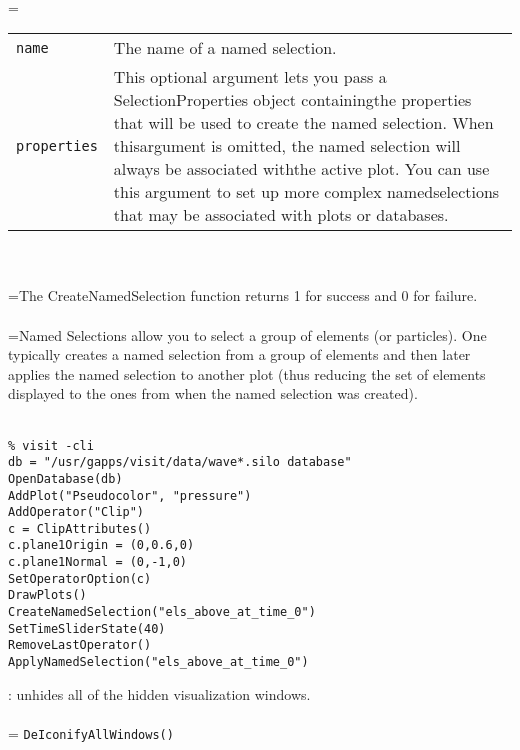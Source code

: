 \documentclass[10pt,a4paper]{report}
\begin{document}
 \\ 
\hangindent=\parindent 
\begin{tabular}{lp{9cm}}
\verb!name! & The name of a named selection. \\
\verb!properties! & This optional argument lets you pass a SelectionProperties object containingthe properties that will be used to create the named selection. When thisargument is omitted, the named selection will always be associated withthe active plot. You can use this argument to set up more complex namedselections that may be associated with plots or databases. \\
\end{tabular} \\[-2mm]


 \\ 
\hangindent=\parindent The CreateNamedSelection function returns 1 for success and 0 for failure. \\[-3mm] 

 \\ 
\hangindent=\parindent Named Selections allow you to select a group of elements (or particles). One typically creates a named selection from a group of elements and then later applies the named selection to another plot (thus reducing the set of elements displayed to the ones from when the named selection was created). \\[-3mm] 

\\[-6mm]
\begin{verbatim}% visit -cli
db = "/usr/gapps/visit/data/wave*.silo database"
OpenDatabase(db)
AddPlot("Pseudocolor", "pressure")
AddOperator("Clip")
c = ClipAttributes()
c.plane1Origin = (0,0.6,0)
c.plane1Normal = (0,-1,0)
SetOperatorOption(c)
DrawPlots()
CreateNamedSelection("els_above_at_time_0")
SetTimeSliderState(40)
RemoveLastOperator()
ApplyNamedSelection("els_above_at_time_0")
\end{verbatim}
\newpage


{}
: unhides all of the hidden visualization windows.\\[-3mm]

 \\ 
\hangindent=\parindent 
\verb!DeIconifyAllWindows()!\\ [-3mm]
\end{document}
